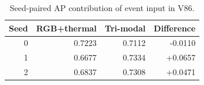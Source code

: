 \begin{table}[t]
\centering
\caption{Seed-paired AP contribution of event input in V86.}
\label{tab:event-contribution-v86-seeds}
\small
\begin{tabular}{@{}rrrr@{}}
\toprule
Seed & RGB+thermal & Tri-modal & Difference\\
\midrule
0 & 0.7223 & 0.7112 & -0.0110\\
1 & 0.6677 & 0.7334 & +0.0657\\
2 & 0.6837 & 0.7308 & +0.0471\\
\bottomrule
\end{tabular}
\end{table}
